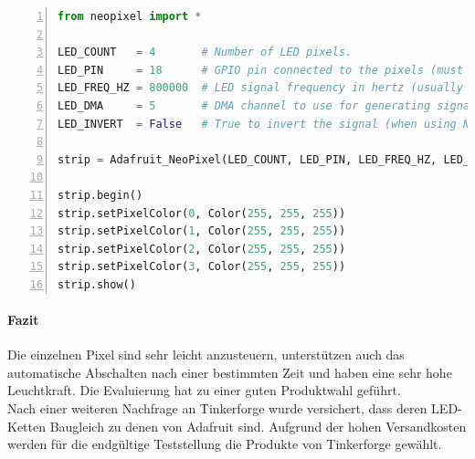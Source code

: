 \begin{itemize}
\begin{lstlisting}[caption = Testcode zur Ansteuerung der LEDs, language=python, frame=single, breaklines=true,columns=fullflexible, commentstyle=\color{gray}\upshape, captionpos=b, numbers = left]
from neopixel import * 
	
LED_COUNT   = 4       # Number of LED pixels. 
LED_PIN     = 18      # GPIO pin connected to the pixels (must support PWM!).
LED_FREQ_HZ = 800000  # LED signal frequency in hertz (usually 800khz)
LED_DMA     = 5       # DMA channel to use for generating signal (try 5)
LED_INVERT  = False   # True to invert the signal (when using NPN)

strip = Adafruit_NeoPixel(LED_COUNT, LED_PIN, LED_FREQ_HZ, LED_DMA, LED_INVERT)

strip.begin()
strip.setPixelColor(0, Color(255, 255, 255))
strip.setPixelColor(1, Color(255, 255, 255))
strip.setPixelColor(2, Color(255, 255, 255))
strip.setPixelColor(3, Color(255, 255, 255))
strip.show()
\end{lstlisting}
\end{itemize}
\paragraph{Fazit}
Die einzelnen Pixel sind sehr leicht anzusteuern, unterstützen auch das automatische Abschalten nach einer bestimmten Zeit und haben eine sehr hohe Leuchtkraft. Die Evaluierung hat zu einer guten Produktwahl geführt. \\ 
Nach einer weiteren Nachfrage an Tinkerforge wurde versichert, dass deren LED-Ketten Baugleich zu denen von Adafruit sind. Aufgrund der hohen Versandkosten werden für die endgültige Teststellung die Produkte von Tinkerforge gewählt.
